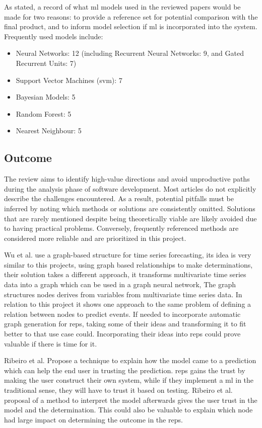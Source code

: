 	As stated, a record of what \gls{ml} models used in the reviewed papers would be made for two reasons: to provide a reference set for potential comparison with the final product, and to inform model selection if \gls{ml} is incorporated into the system.
	Frequently used models include:
	\begin{itemize}
		\item Neural Networks: 12 (including Recurrent Neural Networks: 9, and Gated Recurrent Units: 7)
		\item Support Vector Machines (\gls{svm}): 7
		\item Bayesian Models: 5
		\item Random Forest: 5
		\item Nearest Neighbour: 5
	\end{itemize}

	\subsection{Outcome}
		The review aims to identify high-value directions and avoid unproductive paths during the analysis phase of software development.
		Most articles do not explicitly describe the challenges encountered. As a result, potential pitfalls must be inferred by noting which methods or solutions are consistently omitted. Solutions that are rarely mentioned despite being theoretically viable are likely avoided due to having practical problems. Conversely, frequently referenced methods are considered more reliable and are prioritized in this project.
	
		Wu et al.\cite{WuPan} use a graph-based structure for time series forecasting, its idea is very similar to this projects, using graph based relationships to make determinations, their solution takes a different approach, it transforms multivariate time series data into a graph which can be used in a graph neural network, The graph structures nodes derives from variables from multivariate time series data. In relation to this project it shows one approach to the same problem of defining a relation between nodes to predict events. If needed to incorporate automatic graph generation for \gls{reps}, taking some of their ideas and transforming it to fit better to that use case could. Incorporating their ideas into \gls{reps} could prove valuable if there is time for it.
		
		Ribeiro et al.\cite{Ribeiro} Propose a technique to explain how the model came to a prediction which can help the end user in trusting the prediction. \gls{reps} gains the trust by making the user construct their own system, while if they implement a \gls{ml} in the traditional sense, they will have to trust it based on testing. Ribeiro et al. proposal of a method to interpret the model afterwards gives the user trust in the model and the determination. This could also be valuable to explain which node had large impact on determining the outcome in the \gls{reps}.
		
